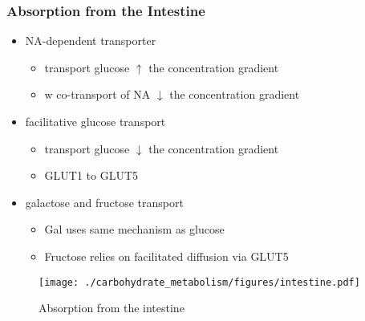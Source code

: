 \documentclass{scrartcl}
\begin{document}
\subsubsection{Absorption from the Intestine}
\label{sec:org32a4825}
\begin{itemize}
\item NA-dependent transporter
\begin{itemize}
\item transport glucose \(\uparrow\) the concentration gradient
\item w co-transport of NA \(\downarrow\) the concentration gradient
\end{itemize}
\item facilitative glucose transport
\begin{itemize}
\item transport glucose \(\downarrow\) the concentration gradient
\item GLUT1 to GLUT5
\end{itemize}
\item galactose and fructose transport
\begin{itemize}
\item Gal uses same mechanism as glucose
\item Fructose relies on facilitated diffusion via GLUT5
\end{itemize}
\end{itemize}

\begin{figure}[htbp]
\centering
\texttt{[image: ./carbohydrate\_metabolism/figures/intestine.pdf]}
\caption{\label{fig:org42881be}
Absorption from the intestine}
\end{figure}
\end{document}
